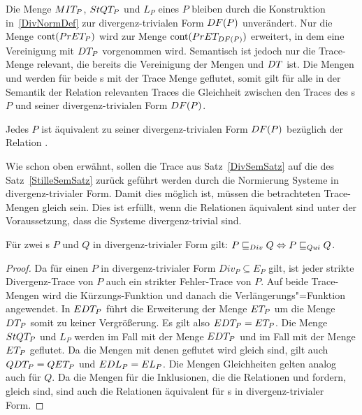 Die Menge $MIT _P$, $StQT _P$ und $L_P$ eines \MEIO{} $P$ bleiben durch die
Konstruktion in~\ref{DivNormDef} zur divergenz-trivialen Form $DF (P)$
unverändert. Nur die Menge $\mathrm{cont} (PrET _P)$ wird zur Menge $\mathrm{cont} (PrET
_{DF (P)})$ erweitert, in dem eine Vereinigung mit $DT _P$ vorgenommen wird.
Semantisch ist jedoch nur die Trace-Menge \EDT{} relevant, die bereits die
Vereinigung der Mengen \ET{} und $DT{}$ ist. Die Mengen \QDT{} und \EDL{}
werden für beide \MEIO{}s mit der Trace Menge \EDT{} geflutet, somit gilt für
alle in der Semantik der Relation \DRel{} relevanten Traces die Gleichheit
zwischen den Traces des \MEIO{}s $P$ und seiner divergenz-trivialen Form $DF
(P)$.

\begin{Prop}
  \label{DivNormProp}
  Jedes \MEIO{} $P$ ist äquivalent zu seiner divergenz-trivialen Form $DF (P)$
  bezüglich der Relation \DRel{}.
\end{Prop}

Wie schon oben erwähnt, sollen die Trace aus Satz~\ref{DivSemSatz} auf die des
Satz~\ref{StilleSemSatz} zurück geführt werden durch die Normierung Systeme in
divergenz-trivialer Form. Damit dies möglich ist, müssen die betrachteten
Trace-Mengen gleich sein. Dies ist erfüllt, wenn die Relationen äquivalent sind
unter der Voraussetzung, dass die Systeme divergenz-trivial sind.

\begin{Lem}
  \label{QDRelDivNormLem}
  Für zwei \MEIO{}s $P$ und $Q$ in divergenz-trivialer Form gilt: $P  \sqsubseteq  _{Div} Q
  \Leftrightarrow P  \sqsubseteq  _{Qui} Q$.
\end{Lem}
\begin{proof}
  Da für einen \MEIO{} $P$ in divergenz-trivialer Form $Div _P \subseteq E _P$
  gilt, ist jeder strikte Divergenz-Trace von $P$ auch ein strikter
  Fehler-Trace von $P$. Auf beide Trace-Mengen wird die Kürzungs-Funktion
  \prune{} und danach die Verlängerungs"=Funktion \cont{} angewendet. In $EDT
  _P$ führt die Erweiterung der Menge $ET _P$ um die Menge $DT _P$ somit zu
  keiner Vergrößerung. Es gilt also $EDT _P = ET _P$. Die Menge $StQT _P$
  und $L _P$ werden im Fall \DRel{} mit der Menge $EDT _P$ und im Fall \QRel{}
  mit der Menge $ET _P$ geflutet. Da die Mengen mit denen geflutet wird gleich
  sind, gilt auch $QDT _P = QET _P$ und $EDL _P = EL _P$. Die Mengen
  Gleichheiten gelten analog auch für $Q$. Da die Mengen für die Inklusionen,
  die die Relationen \DRel{} und \QRel{} fordern, gleich sind, sind auch die
  Relationen äquivalent für \MEIO{}s in divergenz-trivialer Form.
\end{proof}

